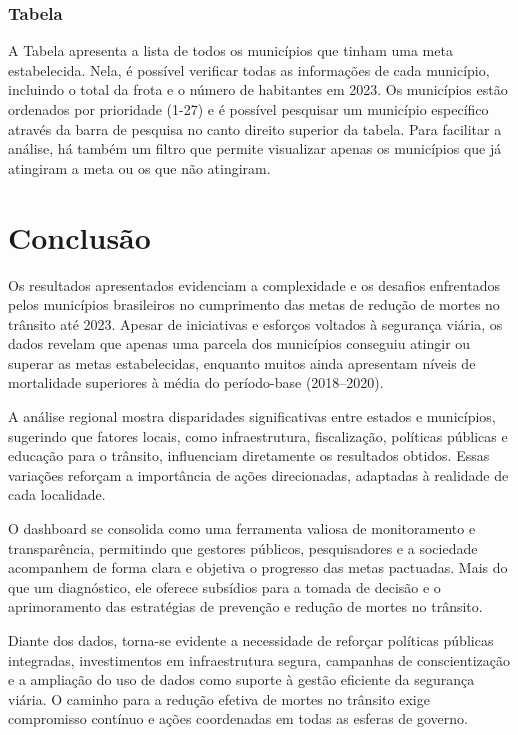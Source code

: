 \documentclass[
  letterpaper,
  DIV=11,
  numbers=noendperiod]{scrreprt}
\begin{document}
\subsection{Tabela}\label{tabela}

A Tabela apresenta a lista de todos os municípios que tinham uma meta
estabelecida. Nela, é possível verificar todas as informações de cada
município, incluindo o total da frota e o número de habitantes em 2023.
Os municípios estão ordenados por prioridade (1-27) e é possível
pesquisar um município específico através da barra de pesquisa no canto
direito superior da tabela. Para facilitar a análise, há também um
filtro que permite visualizar apenas os municípios que já atingiram a
meta ou os que não atingiram.


\chapter{Conclusão}\label{conclusuxe3o}

Os resultados apresentados evidenciam a complexidade e os desafios
enfrentados pelos municípios brasileiros no cumprimento das metas de
redução de mortes no trânsito até 2023. Apesar de iniciativas e esforços
voltados à segurança viária, os dados revelam que apenas uma parcela dos
municípios conseguiu atingir ou superar as metas estabelecidas, enquanto
muitos ainda apresentam níveis de mortalidade superiores à média do
período-base (2018--2020).

A análise regional mostra disparidades significativas entre estados e
municípios, sugerindo que fatores locais, como infraestrutura,
fiscalização, políticas públicas e educação para o trânsito, influenciam
diretamente os resultados obtidos. Essas variações reforçam a
importância de ações direcionadas, adaptadas à realidade de cada
localidade.

O dashboard se consolida como uma ferramenta valiosa de monitoramento e
transparência, permitindo que gestores públicos, pesquisadores e a
sociedade acompanhem de forma clara e objetiva o progresso das metas
pactuadas. Mais do que um diagnóstico, ele oferece subsídios para a
tomada de decisão e o aprimoramento das estratégias de prevenção e
redução de mortes no trânsito.

Diante dos dados, torna-se evidente a necessidade de reforçar políticas
públicas integradas, investimentos em infraestrutura segura, campanhas
de conscientização e a ampliação do uso de dados como suporte à gestão
eficiente da segurança viária. O caminho para a redução efetiva de
mortes no trânsito exige compromisso contínuo e ações coordenadas em
todas as esferas de governo.
\end{document}
